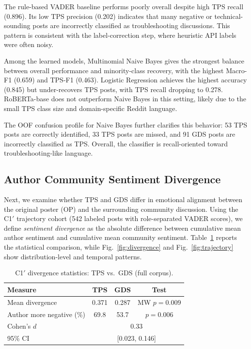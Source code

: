\documentclass[conference]{IEEEtran}
\begin{document}
The rule-based VADER baseline performs poorly overall despite high TPS recall (0.896). Its low TPS precision (0.202) indicates that many negative or technical-sounding posts are incorrectly classified as troubleshooting discussions. This pattern is consistent with the label-correction step, where heuristic API labels were often noisy.

Among the learned models, Multinomial Naive Bayes gives the strongest balance between overall performance and minority-class recovery, with the highest Macro-F1 (0.659) and TPS-F1 (0.463). Logistic Regression achieves the highest accuracy (0.845) but under-recovers TPS posts, with TPS recall dropping to 0.278. RoBERTa-base does not outperform Naive Bayes in this setting, likely due to the small TPS class size and domain-specific Reddit language.

The OOF confusion profile for Naive Bayes further clarifies this behavior: 53 TPS posts are correctly identified, 33 TPS posts are missed, and 91 GDS posts are incorrectly classified as TPS. Overall, the classifier is recall-oriented toward troubleshooting-like language.

\subsection{Author Community Sentiment Divergence}
\label{subsec:results-divergence}

Next, we examine whether TPS and GDS differ in emotional alignment between the original poster (OP) and the surrounding community discussion. Using the C1$'$ trajectory cohort (542 labeled posts with role-separated VADER scores), we define \emph{sentiment divergence} as the absolute difference between cumulative mean author sentiment and cumulative mean community sentiment. Table~\ref{tab:divergence} reports the statistical comparison, while Fig.~\ref{fig:divergence} and Fig.~\ref{fig:trajectory} show distribution-level and temporal patterns.

\begin{table}[t]
\centering
\caption{C1$'$ divergence statistics: TPS vs.\ GDS (full corpus).}
\label{tab:divergence}
\scriptsize
\setlength{\tabcolsep}{4pt}
\begin{tabular}{lccc}
\hline
\textbf{Measure} & \textbf{TPS} & \textbf{GDS} & \textbf{Test} \\
\hline
Mean divergence & 0.371 & 0.287 & MW $p{=}0.009$ \\
Author more negative (\%) & 69.8 & 53.7 & $p{=}0.006$ \\
Cohen's $d$ & \multicolumn{3}{c}{0.33} \\
95\% CI & \multicolumn{3}{c}{[0.023, 0.146]} \\
\hline
\end{tabular}
\end{table}
\end{document}
